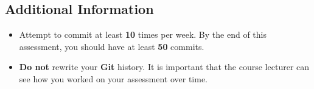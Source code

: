 \documentclass{article}
\begin{document}
\subsection*{Additional Information}
\begin{itemize}
	\item Attempt to commit at least \textbf{10} times per week. By the end of this assessment, you should have at least \textbf{50} commits.
	\item \textbf{Do not} rewrite your \textbf{Git} history. It is important that the course lecturer can see how you worked on your assessment over time. 
\end{itemize}
\end{document}

